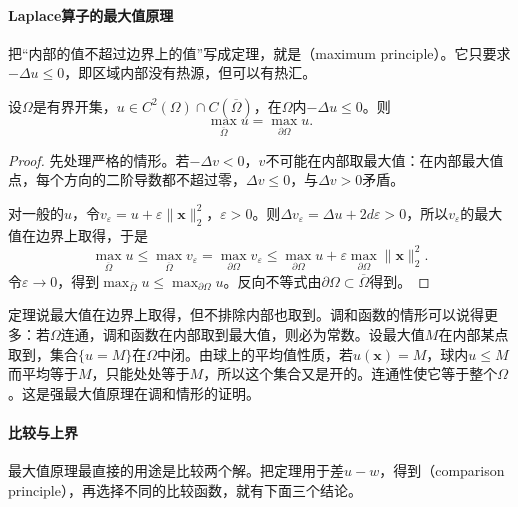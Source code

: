 \paragraph{Laplace算子的最大值原理}
把“内部的值不超过边界上的值”写成定理，就是（maximum principle）。它只要求$-\Delta u\leq0$，即区域内部没有热源，但可以有热汇。

\begin{theorem}[弱最大值原理]
\label{thm:ellip-weak-max}
设$\Omega$是有界开集，$u\in C^2(\Omega)\cap C(\overline\Omega)$，在$\Omega$内$-\Delta u\leq0$。则
\begin{equation}
 \max_{\overline\Omega}u=\max_{\partial\Omega}u.
 \label{eq:ellip-weak-max}
\end{equation}
\end{theorem}

\begin{proof}
先处理严格的情形。若$-\Delta v<0$，$v$不可能在内部取最大值：在内部最大值点，每个方向的二阶导数都不超过零，$\Delta v\leq0$，与$\Delta v>0$矛盾。

对一般的$u$，令$v_\varepsilon=u+\varepsilon\lVert\bm{x}\rVert_2^2$，$\varepsilon>0$。则$\Delta v_\varepsilon=\Delta u+2d\varepsilon>0$，所以$v_\varepsilon$的最大值在边界上取得，于是
\[
 \max_{\overline\Omega}u\leq\max_{\overline\Omega}v_\varepsilon=\max_{\partial\Omega}v_\varepsilon\leq\max_{\partial\Omega}u+\varepsilon\max_{\partial\Omega}\lVert\bm{x}\rVert_2^2 .
\]
令$\varepsilon\to0$，得到$\max_{\overline\Omega}u\leq\max_{\partial\Omega}u$。反向不等式由$\partial\Omega\subset\overline\Omega$得到。
\end{proof}

定理说最大值在边界上取得，但不排除内部也取到。调和函数的情形可以说得更多：若$\Omega$连通，调和函数在内部取到最大值，则必为常数。设最大值$M$在内部某点取到，集合$\{u=M\}$在$\Omega$中闭。由球上的平均值性质，若$u(\bm{x})=M$，球内$u\leq M$而平均等于$M$，只能处处等于$M$，所以这个集合又是开的。连通性使它等于整个$\Omega$。这是强最大值原理在调和情形的证明。

\paragraph{比较与上界}
最大值原理最直接的用途是比较两个解。把定理用于差$u-w$，得到（comparison principle），再选择不同的比较函数，就有下面三个结论。

